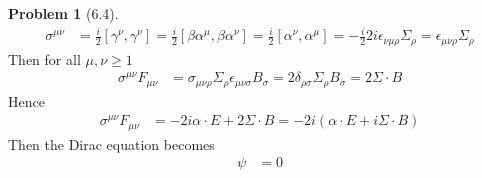 \documentclass[twoside,11pt]{article}
\theoremstyle{definition}
\newtheorem{problem}{Problem}
\theoremstyle{remark}
\begin{document}
\begin{problem}[6.4]
\begin{align*}
    \sigma^{\mu\nu} &=
    \frac{i}{2}[\gamma^\nu, \gamma^\nu]
    = \frac{i}{2}[\beta\alpha^\mu,\beta\alpha^\nu]
    = \frac{i}{2}[\alpha^\nu, \alpha^\mu]
    = -\frac{i}{2}2i\epsilon_{\nu\mu\rho}\Sigma_\rho
    = \epsilon_{\mu\nu\rho}\Sigma_\rho
\end{align*}
Then for all $\mu,\nu\geq 1$
\begin{align*}
    \sigma^{\mu\nu}F_{\mu\nu} &= 
    \sigma_{\mu\nu\rho}\Sigma_\rho \epsilon_{\mu\nu\sigma}B_\sigma
    = 2\delta_{\rho\sigma}\Sigma_\rho B_\sigma
    = 2\Sigma\cdot B
\end{align*}
Hence 
\begin{align*}
    \sigma^{\mu\nu}F_{\mu\nu} &= 
    -2i\alpha\cdot E + 2\Sigma\cdot B
    = -2i (\alpha\cdot E + i\Sigma\cdot B)
\end{align*}
Then the Dirac equation becomes
\begin{align*}
    [(\partial - \frac{e}{c}A)^2
    +\frac{i\hbar e}{c}(\alpha\cdot E + i\Sigma\cdot B)
    - m^2c^2]
    \psi &= 0
\end{align*}

\end{problem}


\end{document}
